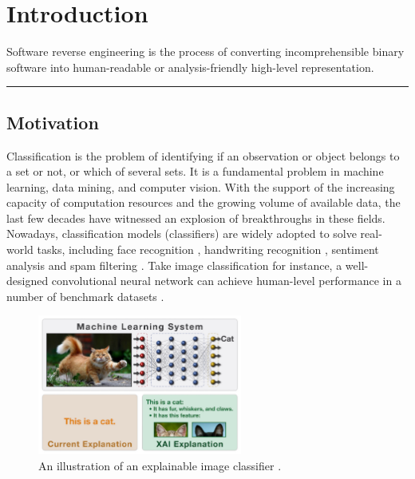 \chapter{Introduction}\label{sec-introduction}

Software reverse engineering is the process of converting incomprehensible binary software into human-readable or analysis-friendly high-level representation.

\noindent\rule{8cm}{0.4pt}

\section{Motivation}


Classification is the problem of identifying if an observation or object belongs to a set or not, or which of several sets. It is a fundamental problem in machine learning, data mining, and computer vision. With the support of the increasing capacity of computation resources and the growing volume of available data, the last few decades have witnessed an explosion of breakthroughs in these fields. Nowadays, classification models (classifiers) are widely adopted to solve real-world tasks, including face recognition \cite{wright2009robust}, handwriting recognition \cite{lecun1990handwritten}, sentiment analysis \cite{pang2002thumbs} and spam filtering \cite{androutsopoulos2000spam}. Take image classification for instance, a well-designed convolutional neural network can achieve human-level performance in a number of benchmark datasets \cite{he2016resnet}.


\begin{figure}[hb]
  \centering
  \includegraphics[width=0.6\textwidth]{figure/explain_cat}
  \caption{An illustration of an explainable image classifier \cite{darpa2017xai}.}
  \label{fig:explain-cat}
\end{figure}

